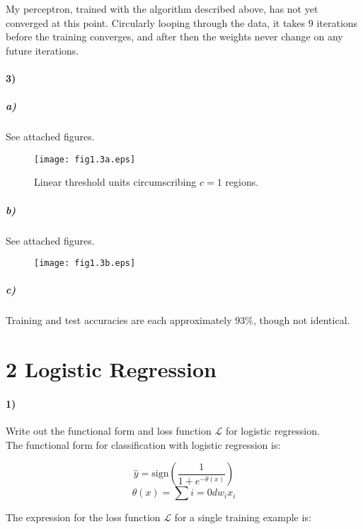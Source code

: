 \documentclass[10pt,letter]{article}
\begin{document}
My perceptron, trained with the algorithm described above, has not yet 
converged at this point.  Circularly looping through the data, it takes $9$ iterations before 
the training converges, and after then the weights never change on any future iterations.

\paragraph{3)}

\subparagraph{a)} See attached figures.
\begin{figure}[b]
\vspace*{-1cm}
\centering
\texttt{[image: fig1.3a.eps]}
\caption{Linear threshold units circumscribing $c=1$ regions.}
\end{figure}

\subparagraph{b)} See attached figures.
\begin{figure}[b]
\vspace*{-2cm}
\centering
\texttt{[image: fig1.3b.eps]}
\end{figure}

\subparagraph{c)} Training and test accuracies are each approximately $93\%$, though not identical.

\section*{2 Logistic Regression}

\paragraph{1)} Write out the functional form and loss function $\mathcal{L}$ for logistic regression.\\

The functional form for classification with logistic regression is:

\[ \hat{y} = \text{sign}(\frac{1}{1 + e^{-\theta(x)}}) \]
\[ \theta(x) = \sum{i=0}{d}{w_ix_i} \]

The expression for the loss function $\mathcal{L}$ for a single training example is:
\end{document}
